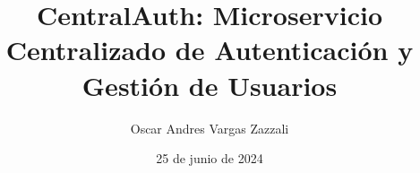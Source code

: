 \title{CentralAuth: Microservicio Centralizado de Autenticación y Gestión de Usuarios}
\author{Oscar Andres Vargas Zazzali}
\date{25 de junio de 2024}